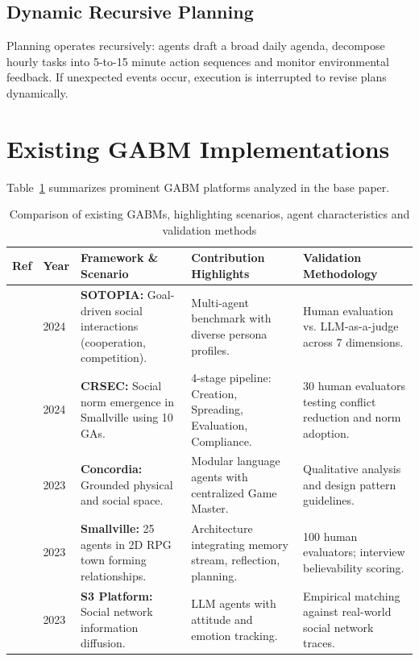 \documentclass[12pt,a4paper]{report}
\begin{document}
\subsection{Dynamic Recursive Planning}
Planning operates recursively: agents draft a broad daily agenda, decompose hourly tasks into 5-to-15 minute action sequences and monitor environmental feedback. If unexpected events occur, execution is interrupted to revise plans dynamically.

\section{Existing GABM Implementations}
\label{sec:prominent_gabms}

Table~\ref{tab:table2_gabms} summarizes prominent GABM platforms analyzed in the base paper.

\begin{table}[H]
\centering
\caption{Comparison of existing GABMs, highlighting scenarios, agent characteristics and validation methods}
\label{tab:table2_gabms}
\vspace{0.1cm}
\setlength{\tabcolsep}{3.5pt}
\renewcommand{\arraystretch}{1.05}
\footnotesize
\begin{tabular}{|p{1.0cm}|p{1.0cm}|p{4.0cm}|p{4.1cm}|p{4.1cm}|}
\hline
\textbf{Ref} & \textbf{Year} & \textbf{Framework \& Scenario} & \textbf{Contribution Highlights} & \textbf{Validation Methodology} \\
\hline
\cite{sotopia2024} & 2024 & \textbf{SOTOPIA:} Goal-driven social interactions (cooperation, competition). & Multi-agent benchmark with diverse persona profiles. & Human evaluation vs. LLM-as-a-judge across 7 dimensions. \\
\hline
\cite{socialnorms2024} & 2024 & \textbf{CRSEC:} Social norm emergence in Smallville using 10 GAs. & 4-stage pipeline: Creation, Spreading, Evaluation, Compliance. & 30 human evaluators testing conflict reduction and norm adoption. \\
\hline
\cite{concordia2023} & 2023 & \textbf{Concordia:} Grounded physical and social space. & Modular language agents with centralized Game Master. & Qualitative analysis and design pattern guidelines. \\
\hline
\cite{park2023generative} & 2023 & \textbf{Smallville:} 25 agents in 2D RPG town forming relationships. & Architecture integrating memory stream, reflection, planning. & 100 human evaluators; interview believability scoring. \\
\hline
\cite{s32023} & 2023 & \textbf{S3 Platform:} Social network information diffusion. & LLM agents with attitude and emotion tracking. & Empirical matching against real-world social network traces. \\
\hline
\end{tabular}
\end{table}
\end{document}
